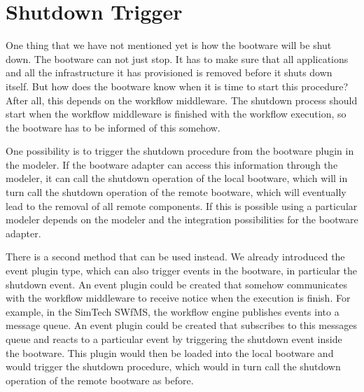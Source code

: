 \section{Shutdown Trigger}
\label{design:shutdown}

One thing that we have not mentioned yet is how the bootware will be shut down.
The bootware can not just stop.
It has to make sure that all applications and all the infrastructure it has provisioned is removed before it shuts down itself.
But how does the bootware know when it is time to start this procedure?
After all, this depends on the workflow middleware.
The shutdown process should start when the workflow middleware is finished with the workflow execution, so the bootware has to be informed of this somehow.

One possibility is to trigger the shutdown procedure from the bootware plugin in the modeler.
If the bootware adapter can access this information through the modeler, it can call the shutdown operation of the local bootware, which will in turn call the shutdown operation of the remote bootware, which will eventually lead to the removal of all remote components.
If this is possible using a particular modeler depends on the modeler and the integration possibilities for the bootware adapter.

There is a second method that can be used instead.
We already introduced the event plugin type, which can also trigger events in the bootware, in particular the shutdown event.
An event plugin could be created that somehow communicates with the workflow middleware to receive notice when the execution is finish.
For example, in the SimTech SWfMS, the workflow engine publishes events into a message queue.
An event plugin could be created that subscribes to this messages queue and reacts to a particular event by triggering the shutdown event inside the bootware.
This plugin would then be loaded into the local bootware and would trigger the shutdown procedure, which would in turn call the shutdown operation of the remote bootware as before.
